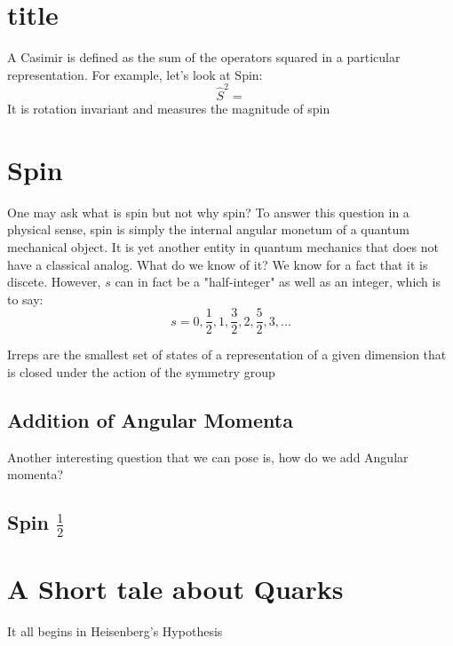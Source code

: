 \documentclass[]{article}
\begin{document}
\section{title}
A Casimir is defined as the sum of the operators squared in a particular representation. For example, let's look at Spin:
\begin{equation}
\hat{S}^{2} = 
\end{equation}
It is rotation invariant and measures the magnitude of spin

\section{Spin}
One may ask what is spin but not why spin? To answer this question in a physical sense, spin is simply the internal angular monetum of a quantum mechanical object. It is yet another entity in quantum mechanics that does not have a classical analog. What do we know of it? We know for a fact that it is discete. 
However, $s$ can in fact be a "half-integer" as well as an integer, which is to say:
$$s = 0, \frac{1}{2}, 1, \frac{3}{2}, 2, \frac{5}{2}, 3, ...$$

Irreps are
the smallest set of states of a representation of a given dimension that is
closed under the action of the symmetry group
\subsection{Addition of Angular Momenta}
Another interesting question that we can pose is, how do we add Angular momenta? 
\subsection{Spin $\frac{1}{2}$}

\section{A Short tale about Quarks}
It all begins in Heisenberg's Hypothesis
\end{document}
